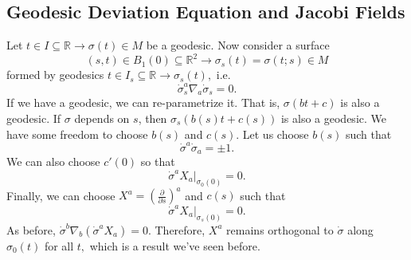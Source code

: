 \documentclass{article}
\numberwithin{equation}{section}
\begin{document}
\subsection{Geodesic Deviation Equation and Jacobi Fields}
Let $t\in I \subseteq \mathbb{R} \to \sigma(t) \in M$ be a geodesic. Now consider a surface
\begin{equation*}
    (s,t) \in B_1(0) \subseteq \mathbb{R}^2 \to \sigma_{s}(t) = \sigma(t;s) \in M
\end{equation*}
formed by geodesics $t\in I_s \subseteq \mathbb{R} \to \sigma_s(t),$ i.e. 
\begin{equation*}
    \dot{\sigma}_s^a \nabla_a \dot{\sigma}_s = 0.
\end{equation*}
If we have a geodesic, we can re-parametrize it. That is, $\sigma(bt+c)$ is also a geodesic. If $\sigma$ depends on $s$, then $\sigma_s(b(s)t+c(s))$ is also a geodesic. We have some freedom to choose $b(s)$ and $c(s).$ Let us choose $b(s)$ such that 
\begin{equation*}
    \dot{\sigma}^a\dot{\sigma}_a = \pm 1.
\end{equation*}
We can also choose $c'(0)$ so that 
\begin{equation*}
    \dot{\sigma}^aX_a\bigg|_{\sigma_0(0)} = 0.
\end{equation*}
Finally, we can choose $X^a = \left(\frac{\partial}{\partial s}\right)^a$ and $c(s)$ such that 
\begin{equation*}
    \dot{\sigma}^aX_a\bigg|_{\sigma_s(0)} = 0.
\end{equation*}
As before, $\dot{\sigma}^b\nabla_b(\dot{\sigma}^aX_a) = 0.$ Therefore, $X^a$ remains orthogonal to $\dot{\sigma}$ along $\sigma_0(t)$ for all $t,$ which is a result we've seen before.
\end{document}
